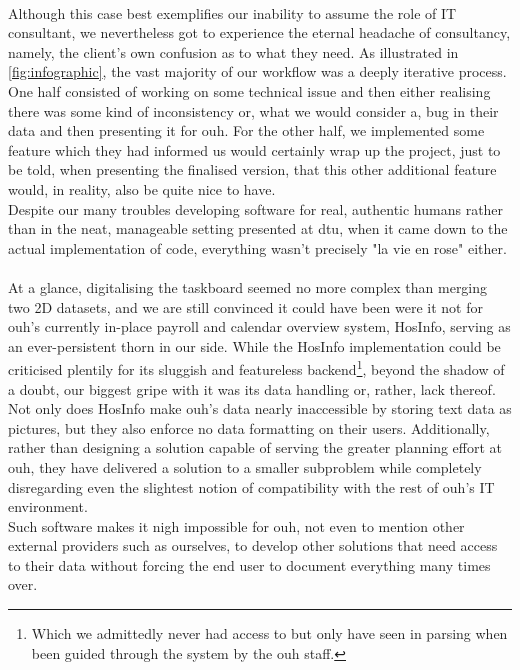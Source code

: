 \\
Although this case best exemplifies our inability to assume the role of IT consultant, we nevertheless got to experience the eternal headache of consultancy, namely, the client's own confusion as to what they need. As illustrated in \autoref{fig:infographic}, the vast majority of our workflow was a deeply iterative process. One half consisted of working on some technical issue and then either realising there was some kind of inconsistency or, what we would consider a, bug in their data and then presenting it for \acrshort{ouh}. For the other half, we implemented some feature which they had informed us would certainly wrap up the project, just to be told, when presenting the finalised version, that this other additional feature would, in reality, also be quite nice to have.
\\
Despite our many troubles developing software for real, authentic humans rather than in the neat, manageable setting presented at \acrshort{dtu}, when it came down to the actual implementation of code, everything wasn't precisely "la vie en rose" either.
\\
\\
At a glance, digitalising the taskboard seemed no more complex than merging two 2D datasets, and we are still convinced it could have been were it not for \acrshort{ouh}'s currently in-place payroll and calendar overview system, HosInfo, serving as an ever-persistent thorn in our side. While the HosInfo implementation could be criticised plentily for its sluggish and featureless backend\footnote{Which we admittedly never had access to but only have seen in parsing when been guided through the system by the \acrshort{ouh} staff.}, beyond the shadow of a doubt, our biggest gripe with it was its data handling or, rather, lack thereof. Not only does HosInfo make \acrshort{ouh}'s data nearly inaccessible by storing text data as pictures, but they also enforce no data formatting on their users. Additionally, rather than designing a solution capable of serving the greater planning effort at \acrshort{ouh}, they have delivered a solution to a smaller subproblem while completely disregarding even the slightest notion of compatibility with the rest of \acrshort{ouh}'s IT environment.
\\
Such software makes it nigh impossible for \acrshort{ouh}, not even to mention other external providers such as ourselves, to develop other solutions that need access to their data without forcing the end user to document everything many times over.
\\ 
